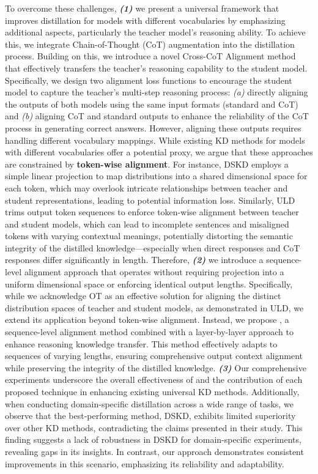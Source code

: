 To overcome these challenges, \textbf{\textit{(1)}} we present a universal framework that improves distillation for models with different vocabularies by emphasizing additional aspects, particularly the teacher model’s reasoning ability. To achieve this, we integrate Chain-of-Thought (CoT) augmentation into the distillation process. Building on this, we introduce a novel Cross-CoT Alignment method that effectively transfers the teacher’s reasoning capability to the student model. Specifically, we design two alignment loss functions to encourage the student model to capture the teacher’s multi-step reasoning process: \textit{(a)} directly aligning the outputs of both models using the same input formats (standard and CoT) and \textit{(b)} aligning CoT and standard outputs to enhance the reliability of the CoT process in generating correct answers. However, aligning these outputs requires handling different vocabulary mappings. While existing KD methods for models with different vocabularies offer a potential proxy, we argue that these approaches are constrained by \textbf{token-wise alignment}. For instance, DSKD employs a simple linear projection to map distributions into a shared dimensional space for each token, which may overlook intricate relationships between teacher and student representations, leading to potential information loss. Similarly, ULD trims output token sequences to enforce token-wise alignment between teacher and student models, which can lead to incomplete sentences and misaligned tokens with varying contextual meanings, potentially distorting the semantic integrity of the distilled knowledge—especially when direct responses and CoT responses differ significantly in length. Therefore, \textbf{\textit{(2)}} we introduce a sequence-level alignment approach that operates without requiring projection into a uniform dimensional space or enforcing identical output lengths. Specifically, while we acknowledge OT as an effective solution for aligning the distinct distribution spaces of teacher and student models, as demonstrated in ULD, we extend its application beyond token-wise alignment. Instead, we propose \method, a sequence-level alignment method combined with a layer-by-layer approach to enhance reasoning knowledge transfer. This method effectively adapts to sequences of varying lengths, ensuring comprehensive output context alignment while preserving the integrity of the distilled knowledge. \textbf{\textit{(3)}} Our comprehensive experiments underscore the overall effectiveness of \method and the contribution of each proposed technique in enhancing existing universal KD methods. Additionally, when conducting domain-specific distillation across a wide range of tasks, we observe that the best-performing method, DSKD, exhibits limited superiority over other KD methods, contradicting the claims presented in their study. This finding suggests a lack of robustness in DSKD for domain-specific experiments, revealing gaps in its insights. In contrast, our approach demonstrates consistent improvements in this scenario, emphasizing its reliability and adaptability.

